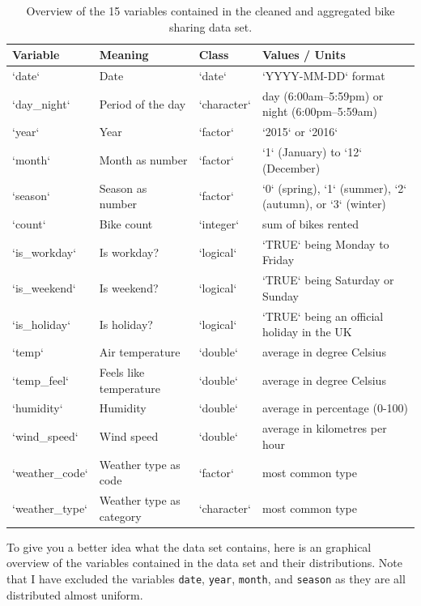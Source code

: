\documentclass[
]{krantz}
\begin{document}
\begin{table}

\caption{\label{tab:data-table}Overview of the 15 variables contained in the cleaned and aggregated bike sharing data set.}
\centering
\fontsize{13}{15}\selectfont
\begin{tabular}[t]{llll}
\toprule
Variable & Meaning & Class & Values / Units\\
\midrule
`date` & Date & `date` & `YYYY-MM-DD` format\\
`day\_night` & Period of the day & `character` & day (6:00am–5:59pm) or night (6:00pm–5:59am)\\
`year` & Year & `factor` & `2015` or `2016`\\
`month` & Month as number & `factor` & `1` (January) to `12` (December)\\
`season` & Season as number & `factor` & `0` (spring), `1` (summer), `2` (autumn), or `3` (winter)\\
\addlinespace
`count` & Bike count & `integer` & sum of bikes rented\\
`is\_workday` & Is workday? & `logical` & `TRUE` being Monday to Friday\\
`is\_weekend` & Is weekend? & `logical` & `TRUE` being Saturday or Sunday\\
`is\_holiday` & Is holiday? & `logical` & `TRUE` being an official holiday in the UK\\
`temp` & Air temperature & `double` & average in degree Celsius\\
\addlinespace
`temp\_feel` & Feels like temperature & `double` & average in degree Celsius\\
`humidity` & Humidity & `double` & average in percentage (0-100)\\
`wind\_speed` & Wind speed & `double` & average in kilometres per hour\\
`weather\_code` & Weather type as code & `factor` & most common type\\
`weather\_type` & Weather type as category & `character` & most common type\\
\bottomrule
\end{tabular}
\end{table}

To give you a better idea what the data set contains, here is an graphical overview of the variables contained in the data set and their distributions. Note that I have excluded the variables \texttt{date}, \texttt{year}, \texttt{month}, and \texttt{season} as they are all distributed almost uniform.
\end{document}
